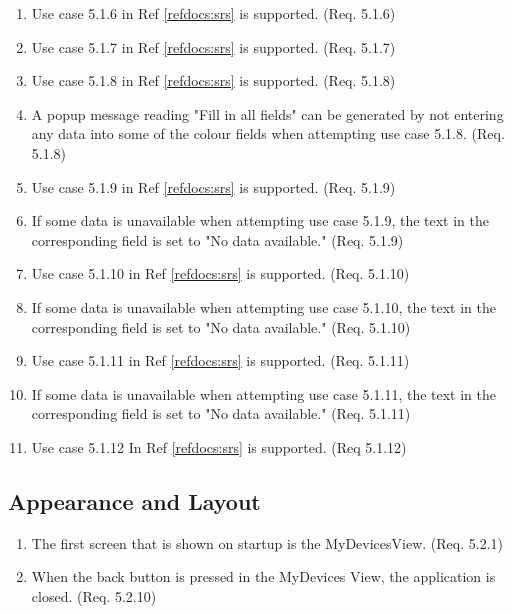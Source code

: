 \documentclass[a4paper]{article}
\newlength{\testlabellength}
\newenvironment{testlist}{\begin{enumerate}[label=\bfseries Test \thesubsection.\arabic* , labelindent=0pt, labelwidth=\testlabellength , leftmargin=2cm]}{\end{enumerate}}
\begin{document}
\begin{appendices}
\begin{testlist}
	\item Use case 5.1.6 in Ref \ref{refdocs:srs} is supported. (Req. 5.1.6)
	
	\item Use case 5.1.7 in Ref \ref{refdocs:srs}  is supported. (Req. 5.1.7)
	
	\item Use case 5.1.8 in Ref \ref{refdocs:srs}  is supported. (Req. 5.1.8)
	
	\item A popup message reading "Fill in all fields" can be generated by not entering any data into some of the colour fields when attempting use case 5.1.8. (Req. 5.1.8)
	
	\item Use case 5.1.9 in Ref \ref{refdocs:srs} is supported. (Req. 5.1.9)
	
	\item If some data is unavailable when attempting use case 5.1.9, the text in the corresponding field is set to "No data available." (Req. 5.1.9)
	
	\item Use case 5.1.10 in Ref \ref{refdocs:srs} is supported. (Req. 5.1.10)
	
	\item If some data is unavailable when attempting use case 5.1.10, the text in the corresponding field is set to "No data available." (Req. 5.1.10)
	
	\item Use case 5.1.11 in Ref \ref{refdocs:srs} is supported. (Req. 5.1.11)
	
	\item If some data is unavailable when attempting use case 5.1.11, the text in the corresponding field is set to "No data available." (Req. 5.1.11)
	
	\item Use case 5.1.12 In Ref \ref{refdocs:srs} is supported. (Req 5.1.12)
	
\end{testlist}

\subsection{Appearance and Layout}

\begin{testlist}
	\item The first screen that is shown on startup is the MyDevicesView. (Req. 5.2.1)
	
	\item When the back button is pressed in the MyDevices View, the application is closed. (Req. 5.2.10)	
	

\end{testlist}
\end{appendices}
\end{document}
